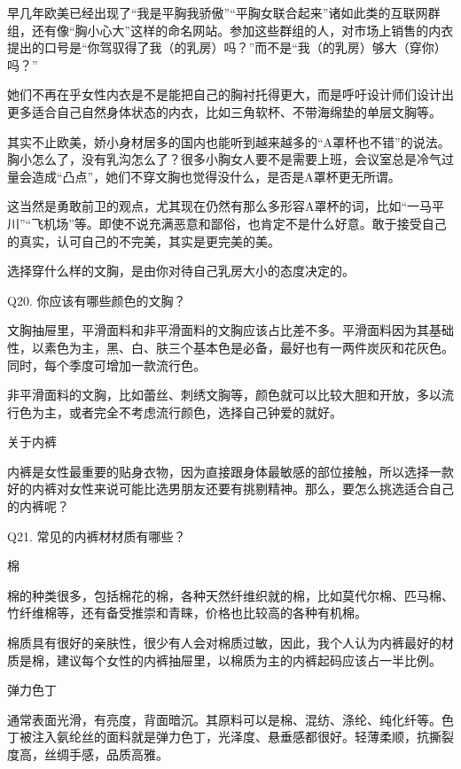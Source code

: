 \documentclass[12pt,UTF8]{ctexbook}
\begin{document}
早几年欧美已经出现了“我是平胸我骄傲”“平胸女联合起来”诸如此类的互联网群组，还有像“胸小心大”这样的命名网站。参加这些群组的人，对市场上销售的内衣提出的口号是“你驾驭得了我（的乳房）吗？”而不是“我（的乳房）够大（穿你）吗？”

她们不再在乎女性内衣是不是能把自己的胸衬托得更大，而是呼吁设计师们设计出更多适合自己自然身体状态的内衣，比如三角软杯、不带海绵垫的单层文胸等。

其实不止欧美，娇小身材居多的国内也能听到越来越多的“A罩杯也不错”的说法。胸小怎么了，没有乳沟怎么了？很多小胸女人要不是需要上班，会议室总是冷气过量会造成“凸点”，她们不穿文胸也觉得没什么，是否是A罩杯更无所谓。

这当然是勇敢前卫的观点，尤其现在仍然有那么多形容A罩杯的词，比如“一马平川”“飞机场”等。即使不说充满恶意和鄙俗，也肯定不是什么好意。敢于接受自己的真实，认可自己的不完美，其实是更完美的美。

选择穿什么样的文胸，是由你对待自己乳房大小的态度决定的。





Q20. 你应该有哪些颜色的文胸？


文胸抽屉里，平滑面料和非平滑面料的文胸应该占比差不多。平滑面料因为其基础性，以素色为主，黑、白、肤三个基本色是必备，最好也有一两件炭灰和花灰色。同时，每个季度可增加一款流行色。

非平滑面料的文胸，比如蕾丝、刺绣文胸等，颜色就可以比较大胆和开放，多以流行色为主，或者完全不考虑流行颜色，选择自己钟爱的就好。

关于内裤


内裤是女性最重要的贴身衣物，因为直接跟身体最敏感的部位接触，所以选择一款好的内裤对女性来说可能比选男朋友还要有挑剔精神。那么，要怎么挑选适合自己的内裤呢？





Q21. 常见的内裤材材质有哪些？


棉

棉的种类很多，包括棉花的棉，各种天然纤维织就的棉，比如莫代尔棉、匹马棉、竹纤维棉等，还有备受推崇和青睐，价格也比较高的各种有机棉。

棉质具有很好的亲肤性，很少有人会对棉质过敏，因此，我个人认为内裤最好的材质是棉，建议每个女性的内裤抽屉里，以棉质为主的内裤起码应该占一半比例。

弹力色丁

通常表面光滑，有亮度，背面暗沉。其原料可以是棉、混纺、涤纶、纯化纤等。色丁被注入氨纶丝的面料就是弹力色丁，光泽度、悬垂感都很好。轻薄柔顺，抗撕裂度高，丝绸手感，品质高雅。
\end{document}
